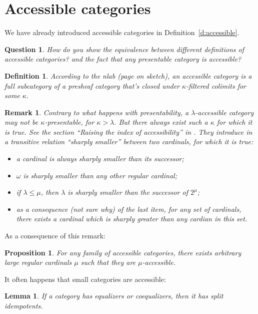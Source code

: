 \documentclass{article}
\newtheorem{definition}[theorem]{Definition}
\newtheorem{proposition}[theorem]{Proposition}
\newtheorem{question}[theorem]{Question}
\newtheorem{remark}[theorem]{Remark}
\newtheorem{lemma}[theorem]{Lemma}
\begin{document}
\section{Accessible categories}
We have already introduced accessible categories in Definition~\ref{d:accessible}.
\begin{question}
  How do you show the equivalence between different definitions of accessible
  categories? and the fact that any presentable category is accessible?
\end{question}
\begin{definition}
According to the nlab (page on sketch), an accessible category is
a full subcategory of a presheaf category that’s closed under $\kappa$-filtered colimits for some $\kappa$.
\end{definition}
\begin{remark}
 Contrary to what happens with presentability,
 a $\lambda$-accessible category may not be $\kappa$-presentable, for $\kappa > \lambda$.
 But there always exist such a $\kappa$ for which it is true.
 See the section ``Raising the index of accessibility'' in \cite{adamek_rosicky}.
 They introduce in \cite[2.12]{adamek_rosicky} a transitive relation ``sharply smaller''
 between two cardinals, for which it is true:
 \begin{itemize}
 \item 
   a cardinal is always
   sharply smaller than its successor;
   \item $\omega$ is sharply smaller than any other regular cardinal;
     \item if $\lambda\leq \mu$, then $\lambda$ is sharply smaller than
       the successor of $2^\mu$;
      \item as a consequence (not sure why) of the last item, for any set of cardinals, there
        exists a cardinal which is sharply greater than any cardian in this set.
 \end{itemize}
\end{remark}
As a consequence of this remark:
\begin{proposition}
  For any family of accessible categories,
  there exists arbitrary large regular
 cardinals $\mu$ such that they are $\mu$-accessible.
\end{proposition}
It often happens that small categories are accessible:
\begin{lemma}
 If a category has equalizers or coequalizers, then it has split idempotents.
\end{lemma}
\end{document}

